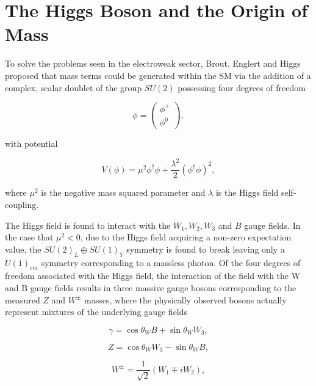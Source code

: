 \section{The Higgs Boson and the Origin of Mass}

To solve the problems seen in the electroweak sector, Brout, Englert and Higgs \cite{PhysRevLett.13.508}\cite{PhysRevLett.13.321} proposed that mass terms could be generated within the \ac{SM} via the addition of a complex, scalar doublet of the group $SU(2)$ possessing four degrees of freedom

\begin{equation}
\phi = \begin{pmatrix} \phi^{+} \\ \phi^{0} \end{pmatrix}, 
\end{equation}

with potential

\begin{equation}
V(\phi) = \mu^{2}\phi^{\dagger}\phi + \frac{\lambda^{2}}{2}(\phi^{\dagger}\phi)^{2},
\end{equation}

where $\mu^{2}$ is the negative mass squared parameter and $\lambda$ is the Higgs field self-coupling.

The Higgs field is found to interact with the $W_{1},W_{2},W_{3}$ and $B$ gauge fields. In the case that $\mu^{2}<0$, due to the Higgs field acquiring a non-zero expectation value, the $SU(2)_{L}\oplus SU(1)_{Y}$ symmetry is found to break leaving only a $U(1)_{em}$ symmetry corresponding to a massless photon. Of the four degrees of freedom associated with the Higgs field, the interaction of the field with the W and B gauge fields results in three massive gauge bosons corresponding to the measured $Z$ and $W^{\pm}$ masses, where the physically observed bosons actually represent mixtures of the underlying gauge fields

\begin{equation}
\gamma = \cos\theta_{W}B  +\sin\theta_{W}W_{3}, 
\end{equation}

\begin{equation}
Z = \cos\theta_{W}W_{3}  -\sin\theta_{W}B,
\end{equation}

\begin{equation}
W^{\pm}= \frac{1}{\sqrt{2}}(W_{1}\mp iW_{2}),
\end{equation}

